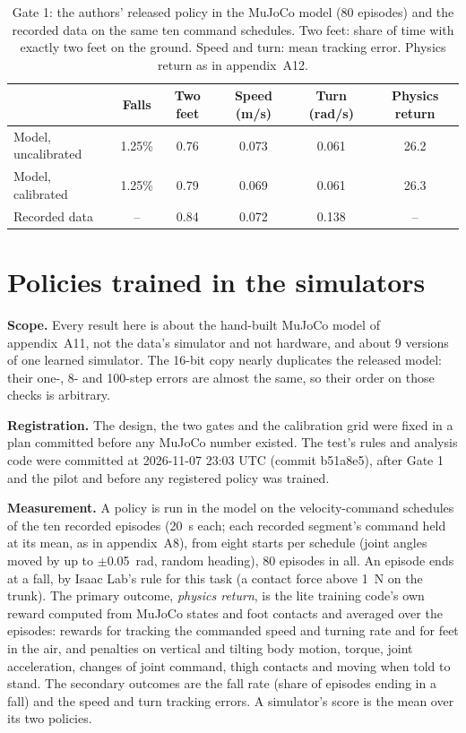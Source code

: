 \begin{table}[h]
\centering
\caption{Gate 1: the authors' released policy in the MuJoCo model (80 episodes) and the recorded data on the
same ten command schedules. Two feet: share of time with exactly two feet on the ground. Speed and turn: mean
tracking error. Physics return as in appendix~A12.}
\label{tab:app-s2gate}
\footnotesize
\begin{tabular}{@{}lccccc@{}}
\toprule
 & Falls & Two feet & Speed (m/s) & Turn (rad/s) & Physics return \\
\midrule
Model, uncalibrated & 1.25\% & 0.76 & 0.073 & 0.061 & 26.2 \\
Model, calibrated & 1.25\% & 0.79 & 0.069 & 0.061 & 26.3 \\
Recorded data & -- & 0.84 & 0.072 & 0.138 & -- \\
\bottomrule
\end{tabular}
\end{table}

\FloatBarrier
\section{Policies trained in the simulators}\label{app:A12}
\textbf{Scope.} Every result here is about the hand-built MuJoCo model of appendix~A11, not the data's simulator and
not hardware, and about 9 versions of one learned simulator. The 16-bit copy nearly duplicates the released
model: their one-, 8- and 100-step errors are almost the same, so their order on those checks is arbitrary.

\textbf{Registration.} The design, the two gates and the calibration grid were fixed in a plan committed before any
MuJoCo number existed. The test's rules and analysis code were committed at 2026-11-07 23:03 UTC (commit
b51a8e5), after Gate 1 and the pilot and before any registered policy was trained.

\textbf{Measurement.} A policy is run in the model on the velocity-command schedules of the ten recorded episodes
(20~s each; each recorded segment's command held at its mean, as in appendix~A8), from eight starts per schedule
(joint angles moved by up to $\pm$0.05~rad, random heading), 80 episodes in all. An episode ends at a fall,
by Isaac Lab's rule for this task (a contact force above 1~N on the trunk). The primary outcome, \emph{physics
return}, is the lite training code's own reward computed from MuJoCo states and foot contacts and averaged over the
episodes: rewards for tracking the commanded speed and turning rate and for feet in the air, and penalties on
vertical and tilting body motion, torque, joint acceleration, changes of joint command, thigh contacts and moving
when told to stand. The secondary outcomes are the fall rate (share of episodes ending in a fall) and the speed and
turn tracking errors. A simulator's score is the mean over its two policies.

